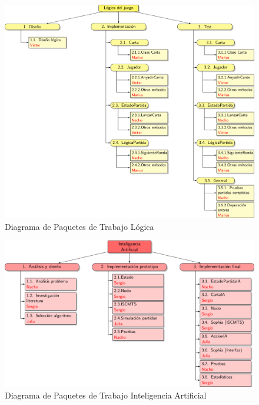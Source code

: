 \begin{figure}[H]
		\hspace{-1cm}
		\includegraphics[scale=0.8]{figuras/edtLogica.pdf}
		\caption{Diagrama de Paquetes de Trabajo Lógica}
	\end{figure}

\begin{figure}[H]
		\centering
		\includegraphics[scale=0.8]{figuras/edtIA.pdf}
		\caption{Diagrama de Paquetes de Trabajo Inteligencia Artificial}
	\end{figure}

